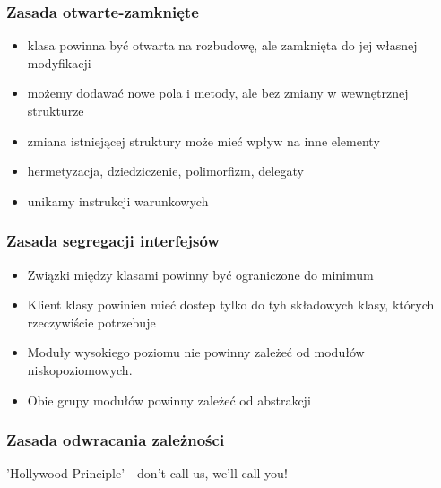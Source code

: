 \documentclass[a4paper]{article}
\begin{document}
\subsubsection{Zasada otwarte-zamknięte}
    \begin{itemize}
        \item klasa powinna być otwarta na rozbudowę, ale zamknięta do jej własnej modyfikacji
        \item możemy dodawać nowe pola i metody, ale bez zmiany w wewnętrznej strukturze
        \item zmiana istniejącej struktury może mieć wpływ na inne elementy
        \item hermetyzacja, dziedziczenie, polimorfizm, delegaty
        \item unikamy instrukcji warunkowych
    \end{itemize}

\subsubsection{Zasada segregacji interfejsów}
\begin{itemize}
    \item Związki między klasami powinny być ograniczone do minimum
    \item Klient klasy powinien mieć dostep tylko do tyh składowych klasy,
    których rzeczywiście potrzebuje
    \item Moduły wysokiego poziomu nie powinny
    zależeć od modułów niskopoziomowych.
    \item Obie grupy modułów powinny zależeć od
    abstrakcji
\end{itemize}

\subsubsection{Zasada odwracania zależności}
'Hollywood Principle' - don't call us, we'll call you!
\end{document}
